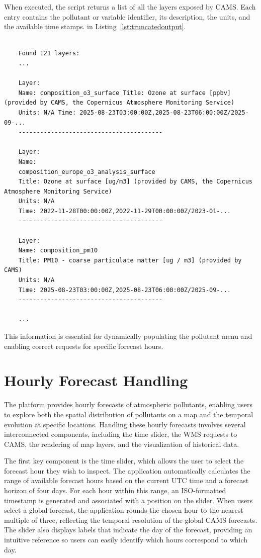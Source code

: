 When executed, the script returns a list of all the layers exposed by CAMS. Each entry contains the pollutant or variable identifier, its description, the units, and the available time stamps. in Listing~\ref{lst:truncatedoutput}.

\begin{lstlisting}[caption={Truncated output of the GetCapabilities request}, label={lst:truncatedoutput}]

	Found 121 layers:
	...
	
	Layer: 
	Name: composition_o3_surface Title: Ozone at surface [ppbv] (provided by CAMS, the Copernicus Atmosphere Monitoring Service)
	Units: N/A Time: 2025-08-23T03:00:00Z,2025-08-23T06:00:00Z/2025-09-... 
	---------------------------------------- 
	
	Layer: 
	Name: 
	composition_europe_o3_analysis_surface 
	Title: Ozone at surface [ug/m3] (provided by CAMS, the Copernicus Atmosphere Monitoring Service) 
	Units: N/A 
	Time: 2022-11-28T00:00:00Z,2022-11-29T00:00:00Z/2023-01-... 
	---------------------------------------- 
	
	Layer: 
	Name: composition_pm10 
	Title: PM10 - coarse particulate matter [ug / m3] (provided by CAMS) 
	Units: N/A 
	Time: 2025-08-23T03:00:00Z,2025-08-23T06:00:00Z/2025-09-... 
	----------------------------------------
	
	...
\end{lstlisting}

This information is essential for dynamically populating the pollutant menu and enabling correct requests for specific forecast hours.


\section{Hourly Forecast Handling}

The platform provides hourly forecasts of atmospheric pollutants, enabling users to explore both the spatial distribution of pollutants on a map and the temporal evolution at specific locations. Handling these hourly forecasts involves several interconnected components, including the time slider, the WMS requests to CAMS, the rendering of map layers, and the visualization of historical data.

The first key component is the time slider, which allows the user to select the forecast hour they wish to inspect. The application automatically calculates the range of available forecast hours based on the current UTC time and a forecast horizon of four days. For each hour within this range, an ISO-formatted timestamp is generated and associated with a position on the slider. When users select a global forecast, the application rounds the chosen hour to the nearest multiple of three, reflecting the temporal resolution of the global CAMS forecasts. The slider also displays labels that indicate the day of the forecast, providing an intuitive reference so users can easily identify which hours correspond to which day.

